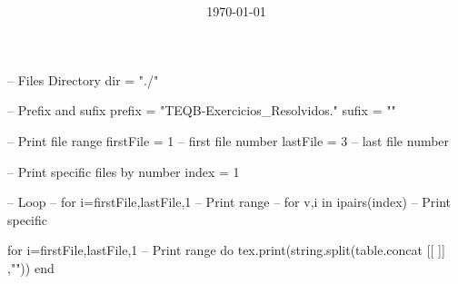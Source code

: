 \documentclass{article}
\title{\huge\bfseries\color{Emph}\mytitle}
\author{\Large\myauthor}
\date{\Large\today}
\begin{document}
\mymaketitle


\begin{luacode*}

    -- Files Directory
    dir = "./"


    -- Prefix and sufix
    prefix = "TEQB-Exercicios_Resolvidos."
    sufix  = ""

    
    -- Print file range
    firstFile = 1 -- first file number
    lastFile  = 3 -- last  file number

    -- Print specific files by number
    index = {1}


    -- Loop
    -- for i=firstFile,lastFile,1 -- Print range
    -- for v,i in ipairs(index)   -- Print specific

    for i=firstFile,lastFile,1 -- Print range
    do
        tex.print(string.split(table.concat{
        [[
            \newpage
        ]]
        },"\n"))
    end

\end{luacode*}
\end{document}
